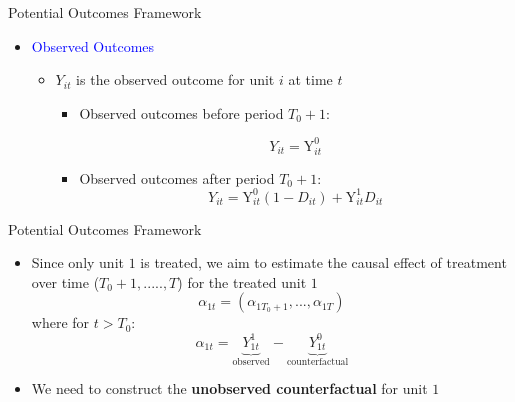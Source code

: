 \documentclass[hyperref={pdfpagelabels=false}]{beamer}
\begin{document}
\begin{frame}{Potential Outcomes Framework}{}
\begin{itemize}

\item \textcolor{blue}{Observed Outcomes}
\vspace{0.2cm}
\begin{itemize}
\item $Y_{it}$ is the observed outcome for unit $i$ at time $t$
\vspace{0.2cm}	
\begin{itemize}
\item Observed outcomes before period $T_0+1$:

\begin{equation*}
Y_{it}=\mathrm{Y}^{0}_{it}
\end{equation*}
\item Observed outcomes after period $T_0+1$: 
\begin{equation*}
Y_{it}=\mathrm{Y}^{0}_{it}(1-D_{it})+\mathrm{Y}^{1}_{it}D_{it}
\end{equation*}
\end{itemize}
\end{itemize}


\end{itemize}
\end{frame}





\begin{frame}{Potential Outcomes Framework}{}
\begin{itemize}
\item Since only unit $1$ is treated, we aim to estimate the causal effect of treatment over time ($T_{0}+1,.....,T$) for the treated unit $1$
\begin{equation*}
\alpha_{1t}=(\alpha_{1T_{0}+1},...,\alpha_{1T})
\end{equation*}
where for $t>T_0$:
\begin{equation*}
\alpha_{1t}=\underbrace{Y^1_{1t}}_{\text{observed}}-\underbrace{Y^0_{1t}}_{\text{counterfactual}}
\end{equation*}
\vspace{0.2cm}
\item We need to construct the \textbf{unobserved counterfactual} for unit $1$
\end{itemize}
\end{frame}
\end{document}
